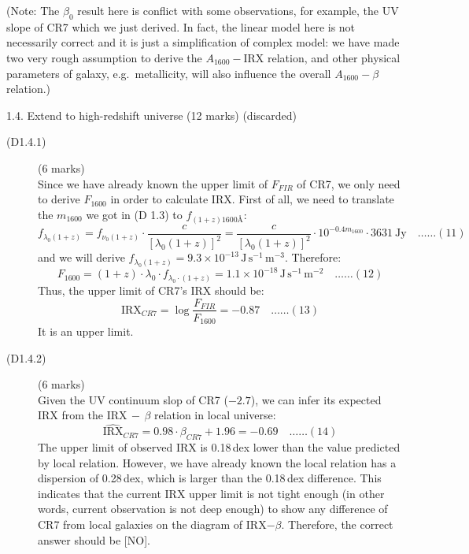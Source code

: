 \begin{description}
  (Note: The $\beta_0$ result here is conflict with some observations, for
  example, the UV slope of CR7 which we just derived. In fact, the linear
  model here is not necessarily correct and it is just a simplification of
  complex model: we have made two very rough assumption to derive the
  $A_{1600}-\mathrm{IRX}$ relation, and other physical parameters of galaxy,
  e.g.\ metallicity, will also influence the overall $A_{1600}-\beta$
  relation.)
\end{description}

1.4. Extend to high-redshift universe \hfill(12 marks) (discarded)

\begin{description}
\item[(D1.4.1)] \hfill(6 marks)\\
  Since we have already known the upper limit of $F_{FIR}$ of CR7, we only
  need to derive $F_{1600}$ in order to calculate IRX. First of all, we need
  to translate the $m_{1600}$ we got in (D 1.3) to
  $f_{(1+z)1600\text{\AA}}$:
  \[ f_{\lambda_0(1+z)} = f_{\nu_0(1+z)}\cdot
     \frac{c}{[\lambda_0(1+z)]^2}
     = \frac{c}{[\lambda_0(1+z)]^2}\cdot 10^{-0.4 m_{1600}}\cdot
     3631\ \mathrm{Jy} \quad\ldots\ldots(11) \]
  and we will derive
  $f_{\lambda_0(1+z)} = 9.3\times 10^{-13}\,
  \mathrm{J\,s^{-1}\,m^{-3}}$. Therefore:
  \[ F_{1600} = (1+z)\cdot\lambda_0\cdot f_{\lambda_0\cdot(1+z)}
     = 1.1\times 10^{-18}\,\mathrm{J\,s^{-1}\,m^{-2}}
     \quad\ldots\ldots(12) \]
  Thus, the upper limit of CR7's IRX should be:
  \[ \mathrm{IRX}_{CR7} = \log\frac{F_{FIR}}{F_{1600}} = -0.87
     \quad\ldots\ldots(13) \]
  It is an upper limit.

\item[(D1.4.2)] \hfill(6 marks)\\
  Given the UV continuum slop of CR7 ($-2.7$), we can infer its expected IRX
  from the IRX$\,-\,\beta$ relation in local universe:
  \[ \widehat{\mathrm{IRX}}_{CR7} = 0.98\cdot\beta_{CR7} + 1.96 = -0.69
     \quad\ldots\ldots(14) \]
  The upper limit of observed IRX is 0.18\,dex lower than the value predicted
  by local relation. However, we have already known the local relation has a
  dispersion of 0.28\,dex, which is larger than the 0.18\,dex difference.
  This indicates that the current IRX upper limit is not tight enough (in
  other words, current observation is not deep enough) to show any difference
  of CR7 from local galaxies on the diagram of IRX$-\beta$. Therefore, the
  correct answer should be [NO].
\end{description}
